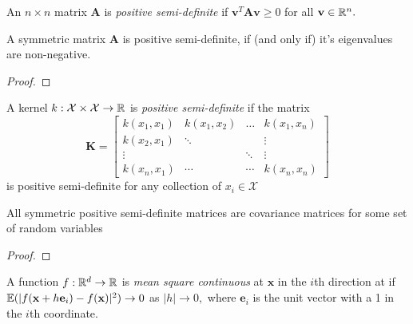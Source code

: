 \color{red}

\begin{definition}\label{def:pos_def_mat}
    An $n\times n$ matrix $\mathbf{A}$ is \emph{positive semi-definite} if
    $\mathbf{v}^T\mathbf{A}\mathbf{v} \geq 0$ for all $\mathbf{v}\in\mathbb{R}^n.$
\end{definition}

\begin{theorem}
    A symmetric matrix $\mathbf{A}$ is positive semi-definite, if (and only if)
    it's eigenvalues are non-negative.
\end{theorem}
\begin{proof}
\end{proof}

\begin{definition}\label{def:pos_def_ker}
    A kernel $k:\mathcal{X}\times\mathcal{X}\to\mathbb{R}$ is
    \emph{positive semi-definite} if the matrix
    $$\mathbf{K} = \begin{bmatrix}
            k(x_1, x_1) & k(x_1, x_2) & \dots  & k(x_1, x_n) \\
            k(x_2, x_1) & \ddots      &        & \vdots      \\
            \vdots      &             & \ddots & \vdots      \\
            k(x_n, x_1) & \cdots      & \cdots & k(x_n, x_n)
        \end{bmatrix}$$
    is positive semi-definite for any collection of $x_i\in\mathcal{X}$
\end{definition}

\begin{theorem}
    All symmetric positive semi-definite matrices are covariance matrices for
    some set of random variables
\end{theorem}
\begin{proof}
\end{proof}

\color{black}

\begin{definition}
    A function $f:\mathbb{R}^d\to\mathbb{R}$ is \emph{mean square continuous} at $\mathbf{x}$
    in the $i$th direction at if
    $\operatorname{\mathbb{E}}(|f(\mathbf{x} + h\mathbf{e}_i) - f(\mathbf{x})|^2)\to 0$ as $|h|\to 0,$
    where $\mathbf{e}_i$ is the unit vector with a 1 in the $i$th coordinate.
\end{definition}

